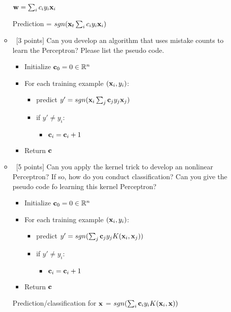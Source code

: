 \documentclass[12pt, fullpage,letterpaper]{article}
\begin{document}
\begin{enumerate}
\begin{itemize}
		${\bf w} = \sum_{i} c_i y_i {\bf x}_i$
		
		Prediction = $sgn({\bf x}_t \sum_{i} c_i y_i {\bf x}_i)$
		
		\item~[3 points] Can you develop an algorithm that uses mistake counts to learn the Perceptron? Please list the pseudo code. 
		
		\begin{itemize}
			\item Initialize ${\bf c}_0 = 0 \in \mathbb{R}^n$
			\item For each training example $({\bf x}_i, y_i)$:
			\begin{itemize}
				\item predict $y' = sgn({\bf x}_i \sum_{j} {\bf c}_j y_j {\bf x}_j)$
				\item if $y' \ne y_i$:
					\begin{itemize}
						\item ${\bf c}_i = {\bf c}_i + 1$
					\end{itemize}
			\end{itemize}
			\item Return ${\bf c}$
		\end{itemize}
		
		\item~[5 points] Can you apply the kernel trick to develop an nonlinear Perceptron? If so, how do you conduct classification? Can you give the pseudo code fo learning this kernel Perceptron? 
		
		\begin{itemize}
			\item Initialize ${\bf c}_0 = 0 \in \mathbb{R}^n$
			\item For each training example $({\bf x}_i, y_i)$:
			\begin{itemize}
				\item predict $y' = sgn(\sum_{j} {\bf c}_j y_j K({\bf x}_i, {\bf x}_j))$
				\item if $y' \ne y_i$: 
				\begin{itemize}
					\item ${\bf c}_i = {\bf c}_i + 1$
				\end{itemize}
			\end{itemize}
			\item Return ${\bf c}$
		\end{itemize}
	
		Prediction/classification for ${\bf x}$ = $sgn(\sum_{i} {\bf c}_i y_i K({\bf x}_i, {\bf x}))$
	
	\end{itemize}   
	
\end{enumerate}
\end{document}
